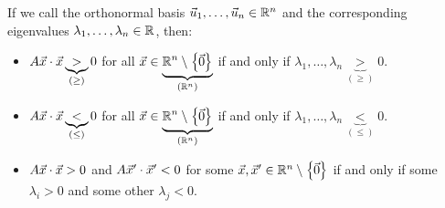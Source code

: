 \documentclass[main.tex]{subfiles}
\begin{document}
\begin{corollary}
    If we call the orthonormal basis $\vec{u}_1, \ldots , \vec{u}_n\in \mathbb R^n$ and the corresponding eigenvalues $\lambda_1, \ldots , \lambda_n\in \mathbb R$, then:
    \begin{itemize}
        \item $A\vec{x}\cdot \vec{x} \underbrace{>}_{(\ge)} 0$ for all $\vec{x}\in \underbrace{\mathbb R^n\setminus \left\{ \vec{0} \right\}}_{(\mathbb R^n)}$ if and only if $\lambda_1, \ldots , \lambda_n \underbrace{>}_{(\ge)} 0$.
        \item $A\vec{x}\cdot \vec{x} \underbrace{<}_{(\le)} 0$ for all $\vec{x}\in \underbrace{\mathbb R^n\setminus \left\{ \vec{0} \right\}}_{(\mathbb R^n)}$ if and only if $\lambda_1, \ldots , \lambda_n \underbrace{<}_{(\le)} 0$.
        \item $A\vec{x}\cdot \vec{x} > 0$ and $A\vec{x}'\cdot \vec{x}' < 0$ for some $\vec{x}, \vec{x}'\in \mathbb R^n\setminus \left\{ \vec{0} \right\}$ if and only if some $\lambda_i > 0$ and some other $\lambda_j < 0$. 
    \end{itemize}
\end{corollary}
\end{document}
